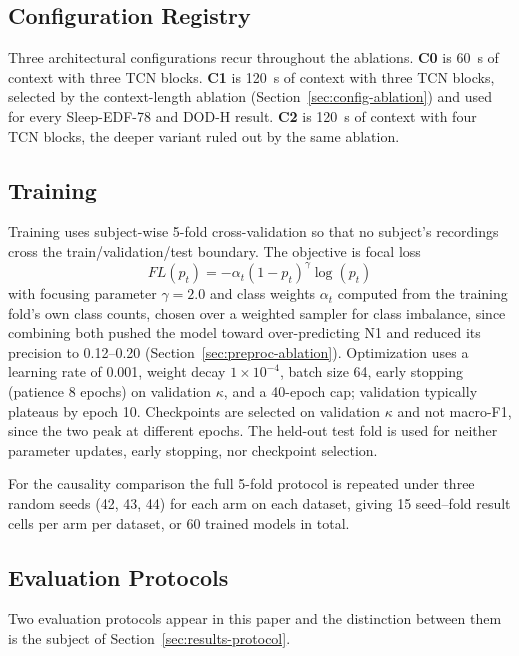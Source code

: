 \documentclass[conference]{IEEEtran}
\begin{document}
\subsection{Configuration Registry}

Three architectural configurations recur throughout the ablations. \textbf{C0} is 60~s of context
with three TCN blocks. \textbf{C1} is 120~s of context with three TCN blocks, selected by the
context-length ablation (Section~\ref{sec:config-ablation}) and used for every Sleep-EDF-78 and
DOD-H result. \textbf{C2} is 120~s of context with four TCN blocks, the deeper variant ruled out by
the same ablation.

\subsection{Training}

Training uses subject-wise 5-fold cross-validation so that no subject's recordings cross the
train/validation/test boundary. The objective is focal loss~\cite{focal}
\begin{equation}
FL(p_t) = -\alpha_t (1-p_t)^{\gamma}\log(p_t)
\end{equation}
with focusing parameter $\gamma = 2.0$ and class weights $\alpha_t$ computed from the training
fold's own class counts, chosen over a weighted sampler for class imbalance, since combining both
pushed the model toward over-predicting N1 and reduced its precision to 0.12--0.20
(Section~\ref{sec:preproc-ablation}). Optimization uses a learning rate of 0.001, weight decay
$1\times10^{-4}$, batch size 64, early stopping (patience 8 epochs) on validation $\kappa$, and a
40-epoch cap; validation typically plateaus by epoch 10. Checkpoints are selected on validation
$\kappa$ and not macro-F1, since the two peak at different epochs. The held-out test fold is used
for neither parameter updates, early stopping, nor checkpoint selection.

For the causality comparison the full 5-fold protocol is repeated under three random seeds (42, 43,
44) for each arm on each dataset, giving 15 seed--fold result cells per arm per dataset, or 60
trained models in total.

\subsection{Evaluation Protocols}
\label{sec:protocol}

Two evaluation protocols appear in this paper and the distinction between them is the subject of
Section~\ref{sec:results-protocol}.
\end{document}
